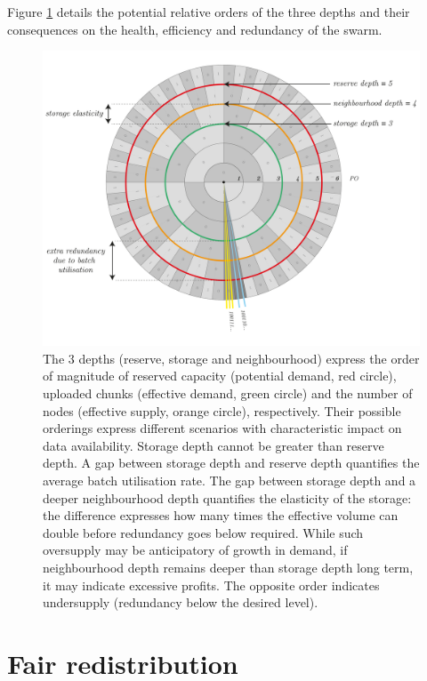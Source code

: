 Figure \ref{fig:depths} details the potential relative orders of the three depths and their consequences on the health, efficiency and redundancy of the swarm.

\begin{figure}[!ht]
  \centering
    \includegraphics[width=.7\textwidth]{fig/depths-2.pdf}
  \caption[Depths]{The 3 depths (reserve, storage and neighbourhood) express the order of magnitude of reserved capacity (potential demand, red circle), uploaded chunks (effective demand, green circle) and the number of nodes (effective supply, orange circle), respectively. Their possible orderings express different scenarios with characteristic impact on data availability. Storage depth cannot be greater than reserve depth. A gap between storage depth and reserve depth quantifies the average batch utilisation rate. The gap between storage depth and a deeper neighbourhood depth quantifies the elasticity of the storage: the difference expresses how many times the effective volume can double before redundancy goes below required. While such oversupply may be anticipatory of growth in demand, if neighbourhood depth remains deeper than storage depth long term, it may indicate excessive profits. The opposite order indicates undersupply (redundancy below the desired level).}
\label{fig:depths}
\end{figure}    


\section{Fair redistribution}\label{sec:redistribution}


